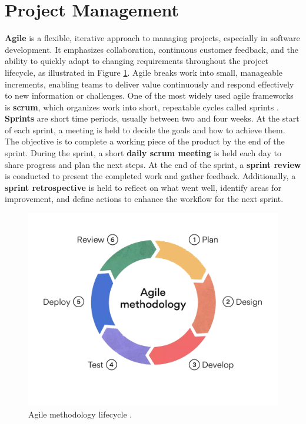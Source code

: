 \section{Project Management}
\label{sec:project-management}

\textbf{Agile} is a flexible, iterative approach to managing projects, especially in software development. It emphasizes collaboration, continuous customer feedback, and the ability to quickly adapt to changing requirements throughout the project lifecycle, as illustrated in Figure \ref{fig:agile-methodology}. Agile breaks work into small, manageable increments, enabling teams to deliver value continuously and respond effectively to new information or challenges. One of the most widely used agile frameworks is \textbf{\gls{scrum}}, which organizes work into short, repeatable cycles called sprints \cite{scrumguides:scrum}. \\

\textbf{Sprints} are short time periods, usually between two and four weeks. At the start of each sprint, a meeting is held to decide the goals and how to achieve them. The objective is to complete a working piece of the product by the end of the sprint. During the sprint, a short \textbf{daily \gls{scrum} meeting} is held each day to share progress and plan the next steps. At the end of the sprint, a \textbf{sprint review} is conducted to present the completed work and gather feedback. Additionally, a \textbf{sprint retrospective} is held to reflect on what went well, identify areas for improvement, and define actions to enhance the workflow for the next sprint. \\

\begin{figure}[h!]
    \centering
    \includegraphics[width=0.75\linewidth]{figures/theory/agile-methodology.png}
    \caption[Agile methodology]{Agile methodology lifecycle \cite{asana:agile}.}
    \label{fig:agile-methodology}
\end{figure}

